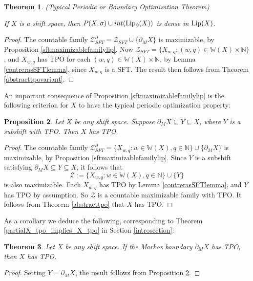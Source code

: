 \documentclass[reqno,11pt]{amsart}
\newtheorem{thm}{Theorem}[section]
\newtheorem{prop}[thm]{Proposition}
\theoremstyle{definition}
\theoremstyle{remark}
\theoremstyle{remark}
\def \N {\mathbb N}
\def\lip{{\rm Lip}}
\def\w{\mathbb{W}}
\def\ZZ{\mathcal{Z}}
\numberwithin{equation}{section}
\begin{document}
\begin{thm}\label{general_tpbo_theorem} (Typical Periodic or Boundary Optimization Theorem)

\noindent
If $X$ is a shift space,
then $P(X,\sigma)\cup int( \lip_{\partial}(X))$ is dense in $\lip(X)$.
\end{thm}
\begin{proof}
The countable family $\ZZ_{SFT}^\partial = \ZZ_{SFT}\cup\{\partial_MX\}$ is maximizable,
by Proposition \ref{sftmaximizablefamilylip}.
Now $\ZZ_{SFT}=\{X_{w,q}:(w,q)\in \w(X)\times\N\}$,
and $X_{w,q}$ has TPO 
for each $(w,q)\in \w(X)\times\N$, by Lemma \ref{contrerasSFTlemma}, since $X_{w,q}$ is a SFT.
The result then follows from Theorem \ref{abstracttpovariant}.
\end{proof}




An important consequence of Proposition \ref{sftmaximizablefamilylip} is the following criterion for $X$ to have 
the typical periodic optimization property:

\begin{prop}\label{Markov_boundary_in_Y_TPO}
Let $X$ be any shift space.
Suppose $\partial_M X\subseteq Y \subseteq X$, where $Y$ is a subshift with TPO.
Then $X$ has TPO.
\end{prop}
\begin{proof}
The countable family $\ZZ_{SFT}^\partial=\{X_{w,q}:w\in\w(X), q\in\N\} \cup \{\partial_MX\}$ is maximizable,
by Proposition
 \ref{sftmaximizablefamilylip}.
Since $Y$ is a subshift satisfying $\partial_M X\subseteq Y \subseteq X$, it follows that
$$\ZZ:=\{X_{w,q}:w\in\w(X), q\in\N\} \cup \{ Y\}$$ is also maximizable.
Each $X_{w,q}$ has TPO
by Lemma  \ref{contrerasSFTlemma},
and $Y$ has TPO by assumption.
So $\ZZ$ is a countable maximizable family with TPO.
It follows from Theorem \ref{abstracttpo} 
that $X$ has TPO.
\end{proof}

As a corollary we deduce the following, corresponding to Theorem \ref{partialX_tpo_implies_X_tpo} in Section \ref{introsection}:

\begin{thm}\label{partialX_tpo_implies_X_tpo_repeated}
Let $X$ be any shift space.
If the Markov boundary $\partial_M X$ has TPO, then $X$ has TPO.
\end{thm}
\begin{proof}
Setting $Y=\partial_M X$, the result follows from Proposition \ref{Markov_boundary_in_Y_TPO}.
\end{proof}
\end{document}
